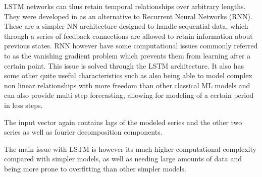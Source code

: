 \begin{itemize}
    LSTM networks can thus retain temporal relationships over arbitrary lengths. They were developed in \cite{hochreiter_schmidhuber_1997} as an alternative to Recurrent Neural Networks (RNN). These are a simpler NN architecture designed to handle sequential data, which through a series of feedback connections are allowed to retain information about previous states. RNN however have some computational issues commonly referred to as the vanishing gradient problem which prevents them from learning after a certain point. This issue is solved through the LSTM architecture. It also has some other quite useful characteristics such as also being able to model complex non linear relationships with more freedom than other classical ML models and can also provide multi step forecasting, allowing for modeling of a certain period in less steps. 

    The input vector again contains lags of the modeled series and the other two series as well as fourier decomposition components. 

    The main issue with LSTM is however its much higher computational complexity compared with simpler models, as well as needing large amounts of data and being more prone to overfitting than other simpler models. 
    

\end{itemize}
